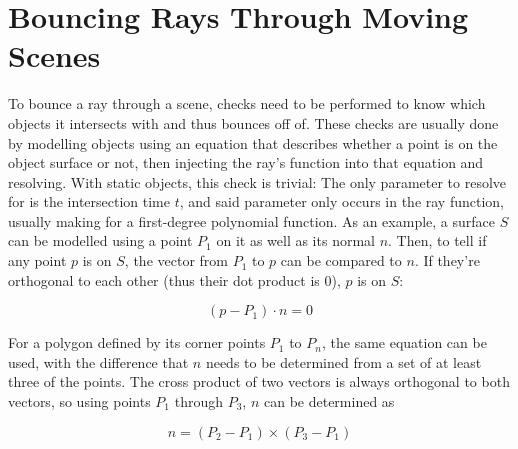 \chapter{Bouncing Rays Through Moving Scenes}\label{ch:Intersection}

To bounce a ray through a scene, checks need to be performed to know which objects it intersects with and thus bounces off of.
These checks are usually done by modelling objects using an equation that describes whether a point is on the object surface or not,
then injecting the ray's function into that equation and resolving.
With static objects, this check is trivial:
The only parameter to resolve for is the intersection time \(t\), and said parameter only occurs in the ray function,
usually making for a first-degree polynomial function.
\newline
As an example, a surface \(S\) can be modelled using a point \(P_1\) on it as well as its normal \(n\).
Then, to tell if any point \(p\) is on \(S\), the vector from \(P_1\) to \(p\) can be compared to \(n\).
If they're orthogonal to each other (thus their dot product is 0), \(p\) is on \(S\):

\begin{equation}\label{StaticSurface}
    (p - P_1) \cdot n = 0
\end{equation}

For a polygon defined by its corner points \(P_{1}\) to \(P_{n}\), the same equation can be used,
with the difference that \(n\) needs to be determined from a set of at least three of the points.
The cross product of two vectors is always orthogonal to both vectors, so using points \(P_{1}\) through \(P_{3}\),
\(n\) can be determined as

\begin{equation}\label{PolygonNormal}
    n = (P_{2} - P_{1}) \times (P_{3} - P_{1})
\end{equation}

